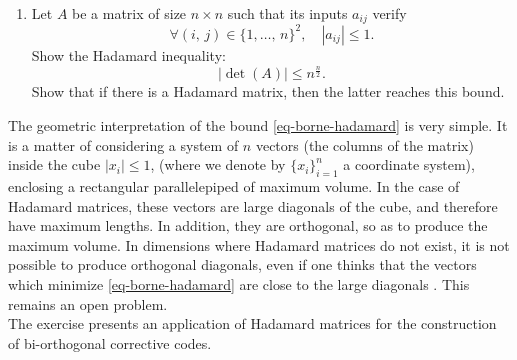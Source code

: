 \begin{exo}
\begin{enumerate}
\item Let $ A $ be a matrix of size $ n \times n $ such that its inputs $ a_{ij} $ verify
\begin{equation*}
\forall (i, \, j) \in \{1, \ldots, \, n\}^2, \quad | a_{ij} | \leq 1.
\end{equation*}
Show the Hadamard inequality:
\begin{equation}
\label{eq-borne-hadamard}
| \det (A) | \leq n^{\frac{n}{2}}.
\end{equation}
Show that if there is a Hadamard matrix, then the latter reaches this bound.
\end{enumerate} The geometric interpretation of the bound \eqref{eq-borne-hadamard} is very simple. It is a matter of considering a system of $ n $ vectors (the columns of the matrix) inside the cube $ | x_i | \leq 1 $, (where we denote by $ \{x_i\}_{i = 1}^n $ a coordinate system), enclosing a rectangular parallelepiped of maximum volume. In the case of Hadamard matrices, these vectors are large diagonals of the cube, and therefore have maximum lengths. In addition, they are orthogonal, so as to produce the maximum volume. In dimensions where Hadamard matrices do not exist, it is not possible to produce orthogonal diagonals, even if one thinks that the vectors which minimize \eqref{eq-borne-hadamard} are close to the large diagonals . This remains an open problem. \\The exercise  presents an application of Hadamard matrices for the construction of bi-orthogonal corrective codes.
\end{exo}
 
